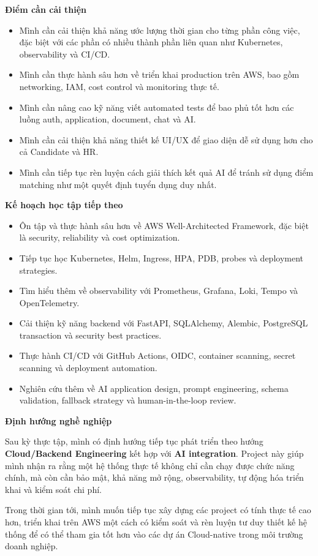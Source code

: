 \vspace{0.5em}\noindent\textbf{Điểm cần cải
thiện}\par

\begin{itemize}
\tightlist
\item
  Mình cần cải thiện khả năng ước lượng thời gian cho từng phần công
  việc, đặc biệt với các phần có nhiều thành phần liên quan như
  Kubernetes, observability và CI/CD.
\item
  Mình cần thực hành sâu hơn về triển khai production trên AWS, bao gồm
  networking, IAM, cost control và monitoring thực tế.
\item
  Mình cần nâng cao kỹ năng viết automated tests để bao phủ tốt hơn các
  luồng auth, application, document, chat và AI.
\item
  Mình cần cải thiện khả năng thiết kế UI/UX để giao diện dễ sử dụng hơn
  cho cả Candidate và HR.
\item
  Mình cần tiếp tục rèn luyện cách giải thích kết quả AI để tránh sử
  dụng điểm matching như một quyết định tuyển dụng duy nhất.
\end{itemize}

\vspace{0.5em}\noindent\textbf{Kế hoạch học tập tiếp
theo}\par

\begin{itemize}
\tightlist
\item
  Ôn tập và thực hành sâu hơn về AWS Well-Architected Framework, đặc
  biệt là security, reliability và cost optimization.
\item
  Tiếp tục học Kubernetes, Helm, Ingress, HPA, PDB, probes và deployment
  strategies.
\item
  Tìm hiểu thêm về observability với Prometheus, Grafana, Loki, Tempo và
  OpenTelemetry.
\item
  Cải thiện kỹ năng backend với FastAPI, SQLAlchemy, Alembic, PostgreSQL
  transaction và security best practices.
\item
  Thực hành CI/CD với GitHub Actions, OIDC, container scanning, secret
  scanning và deployment automation.
\item
  Nghiên cứu thêm về AI application design, prompt engineering, schema
  validation, fallback strategy và human-in-the-loop review.
\end{itemize}

\vspace{0.5em}\noindent\textbf{Định hướng nghề
nghiệp}\par

Sau kỳ thực tập, mình có định hướng tiếp tục phát triển theo hướng
\textbf{Cloud/Backend Engineering} kết hợp với \textbf{AI integration}.
Project này giúp mình nhận ra rằng một hệ thống thực tế không chỉ cần
chạy được chức năng chính, mà còn cần bảo mật, khả năng mở rộng,
observability, tự động hóa triển khai và kiểm soát chi phí.

Trong thời gian tới, mình muốn tiếp tục xây dựng các project có tính
thực tế cao hơn, triển khai trên AWS một cách có kiểm soát và rèn luyện
tư duy thiết kế hệ thống để có thể tham gia tốt hơn vào các dự án
Cloud-native trong môi trường doanh nghiệp.
